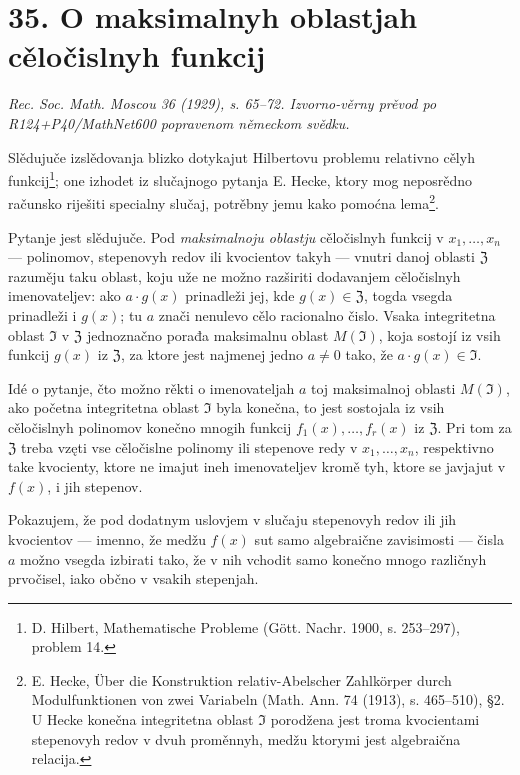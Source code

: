 \documentclass[11pt]{article}
\begin{document}
\section*{35. O maksimalnyh oblastjah cěločislnyh funkcij}
\emph{Rec. Soc. Math. Moscou 36 (1929), s. 65--72. Izvorno-věrny prěvod po R124+P40/MathNet600 popravenom německom svědku.}

Slědujuče izslědovanja blizko dotykajut Hilbertovu problemu relativno cělyh funkcij\footnote{D. Hilbert, Mathematische Probleme (Gött. Nachr. 1900, s. 253--297), problem 14.}; one izhodet iz slučajnogo pytanja E. Hecke, ktory mog neposrědno računsko riješiti specialny slučaj, potrěbny jemu kako pomoćna lema\footnote{E. Hecke, Über die Konstruktion relativ-Abelscher Zahlkörper durch Modulfunktionen von zwei Variabeln (Math. Ann. 74 (1913), s. 465--510), §2. U Hecke konečna integritetna oblast \(\mathfrak{I}\) porodžena jest troma kvocientami stepenovyh redov v dvuh proměnnyh, medžu ktorymi jest algebraična relacija.}.

Pytanje jest slědujuče. Pod \textit{maksimalnoju oblastju} cěločislnyh funkcij v \(x_1,\ldots,x_n\) --- polinomov, stepenovyh redov ili kvocientov takyh --- vnutri danoј oblasti \(\mathfrak{Z}\) razuměju taku oblast, koju uže ne možno razširiti dodavanjem cěločislnyh imenovateljev: ako \(a\cdot g(x)\) prinadleži jej, kde \(g(x)\in\mathfrak{Z}\), togda vsegda prinadleži i \(g(x)\); tu \(a\) znači nenulevo cělo racionalno čislo. Vsaka integritetna oblast \(\mathfrak{I}\) v \(\mathfrak{Z}\) jednoznačno porađa maksimalnu oblast \(M(\mathfrak{I})\), koja sostojí iz vsih funkcij \(g(x)\) iz \(\mathfrak{Z}\), za ktore jest najmenej jedno \(a\ne0\) tako, že \(a\cdot g(x)\in\mathfrak{I}\).

Idé o pytanje, čto možno rěkti o imenovateljah \(a\) toj maksimalnoj oblasti \(M(\mathfrak{I})\), ako početna integritetna oblast \(\mathfrak{I}\) byla konečna, to jest sostojala iz vsih cěločislnyh polinomov konečno mnogih funkcij \(f_1(x),\ldots,f_r(x)\) iz \(\mathfrak{Z}\). Pri tom za \(\mathfrak{Z}\) treba vzęti vse cěločislne polinomy ili stepenove redy v \(x_1,\ldots,x_n\), respektivno take kvocienty, ktore ne imajut ineh imenovateljev kromě tyh, ktore se javjajut v \(f(x)\), i jih stepenov.

Pokazujem, že pod dodatnym uslovjem v slučaju stepenovyh redov ili jih kvocientov --- imenno, že medžu \(f(x)\) sut samo algebraične zavisimosti --- čisla \(a\) možno vsegda izbirati tako, že v nih vchodit samo konečno mnogo različnyh prvočisel, iako občno v vsakih stepenjah.
\end{document}
